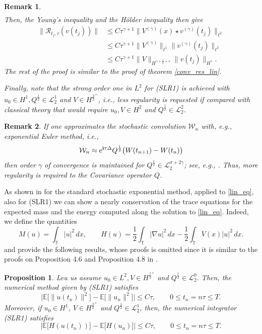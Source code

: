 \documentclass[a4paper]{amsart}
\newtheorem{remark}{Remark}[section]
\newtheorem{proposition}[theorem]{Proposition}
\begin{document}
\begin{remark}
\begin{align*}
\end{align*}
Then, the Young's inequality and the Hölder inequality then give
$$
\begin{aligned}
\|\mathcal{R}_{t_j,\tau}(v(t_j))\|&\le C \tau^{\gamma+1}\|V^{(\gamma)}(x)\star v^{(\gamma)}(t_j)\|_{\ell^2}\\
&\le C \tau^{\gamma+1}\|V^{(\gamma)}\|_{\ell^1}\|v^{(\gamma)}(t_j)\|_{\ell^2}\\
&\le C \tau^{\gamma+1}\|V\|_{H^{\gamma+\frac{1}{2}+s}}\|v(t_j)\|_{H^\gamma}.
\end{aligned}
$$
The rest of the proof is similar to the proof of theorem \ref{conv_res_lin}.

Finally, note that the strong order one in $L^2$ for (SLR1) is achieved with $u_0 \in H^1, Q^{\frac{1}{2}}\in\mathcal{L}_2^1$ and $V\in H^{\frac{3}{2}^+}$, i.e., less regularity is requested if compared with classical theory \cite{an_co} that would require $u_0, V\in H^2$ and $Q^{\frac{1}{2}}\in\mathcal{L}_2^2$.
\end{remark}

\begin{remark}
\label{app_W}
    If one approximates the stochastic convolution $\mathcal{W}_n$ with, e.g., exponential Euler method, i.e.,
    $$
    \mathcal{W}_n\approx {\rm e}^{{\bf i}\tau \Delta}Q^{\frac{1}{2}} \big(W(t_{n+1})-W(t_n)\big)
    $$
    then order $\gamma$ of convergence is maintained for $Q^{\frac{1}{2}}\in \mathcal{L}_2^{\sigma+2\gamma}$; see, e.g., \cite{an_co}. Thus, more regularity is required to the Covariance operator $Q$.
\end{remark}
As shown in \cite{an_co} for the standard stochastic exponential method, applied to \eqref{lin_eq}, also for (SLR1) we can show a nearly conservation of the trace equations for the expected mass and the energy computed along the solution to \eqref{lin_eq}. Indeed, we define the quantities
$$
M(u)=\int_{\mathbb{T}} |u|^2\,dx, \qquad H(u)=\frac{1}{2}\int_{\mathbb{T}}|\nabla u|^2\,dx-\frac{1}{2}\int_{\mathbb{T}} V(x)|u|^2\,dx.
$$
and provide the following results, whose proofs is omitted since it is similar to the proofs on Proposition 4.6 and Proposition 4.8 in \cite{an_co}.
\begin{proposition}
    Leu us assume $u_0\in L^2, V\in H^{\frac{1}{2}^+}$ and $Q^{\frac{1}{2}}\in\mathcal{L}_2^0$. Then, the numerical method given by (SLR1) satisfies
    $$
    \big|\mathbb{E}\big[\|u(t_n)\|^2\big]-\mathbb{E}\big[\|u_n\|^2\big]\big| \le C \tau, \qquad 0\le t_n=n\tau\le T.
    $$
    Moreover, if $u_0 \in H^1$, $V\in H^{\frac{3}{2}^+}$ and $Q^{\frac{1}{2}}\in\mathcal{L}_2^{1}$, then, the numerical integrator (SLR1) satisfies
    $$
    \big|\mathbb{E}\big[H(u(t_n))\big]-\mathbb{E}\big[H(u_n)\big]\big| \le C \tau, \qquad 0\le t_n=n\tau\le T.
    $$
\end{proposition}
\end{document}
